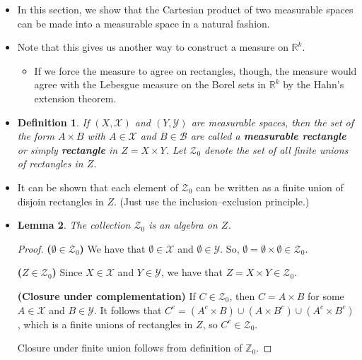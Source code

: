 \documentclass[10pt]{article}
\newtheorem{lemma}{Lemma}
\newtheorem{definition}[lemma]{Definition}
\newcommand{\mcal}[1]{\mathcal{#1}}
\newcommand{\Real}{\mathbb{R}}
\begin{document}
\begin{itemize}
  \item In this section, we show that the Cartesian product of two measurable spaces can be made into a measurable space in a natural fashion.
  
  \item Note that this gives us another way to construct a measure on $\Real^k$.
  \begin{itemize}
    \item If we force the measure to agree on rectangles, though, the measure would agree with the Lebesgue measure on the Borel sets in $\Real^k$ by the Hahn's extension theorem.
  \end{itemize}
  
  \item \begin{definition}
    If $(X,\mcal{X})$ and $(Y,\mcal{Y})$ are measurable spaces, then the set of the form $A \times B$ with $A \in \mcal{X}$ and $B \in \mcal{B}$ are called a {\bf measurable rectangle} or simply {\bf rectangle} in $Z = X \times Y$. Let $\mcal{Z}_0$ denote the set of all finite unions of rectangles in $Z$.
  \end{definition}

  \item It can be shown that each element of $\mcal{Z}_0$ can be written as a finite union of disjoin rectangles in $Z$. (Just use the inclusion--exclusion principle.)
  
  \item \begin{lemma}
    The collection $\mcal{Z}_0$ is an algebra on $Z$.
  \end{lemma}

  \begin{proof}
    {\bf ($\emptyset \in \mcal{Z}_0$)} We have that $\emptyset \in \mcal{X}$ and $\emptyset \in \mcal{Y}$. So, $\emptyset = \emptyset \times \emptyset \in \mcal{Z}_0$.

    {\bf ($Z \in \mcal{Z}_0$)} Since $X \in \mcal{X}$ and $Y \in \mcal{Y}$, we have that $Z = X \times Y \in \mcal{Z}_0$.

    {\bf (Closure under complementation)} If $C \in \mcal{Z}_0$, then $C = A \times B$ for some $A \in \mcal{X}$ and $B \in \mcal{Y}$. It follows that $C^c = (A^c \times B) \cup (A \times B^c) \cup (A^c \times B^c)$, which is a finite unions of rectangles in $Z$, so $C^c \in \mathcal{Z}_0$.

    Closure under finite union follows from definition of $\mathbb{Z}_0$.
  \end{proof}


\end{itemize}
\end{document}
